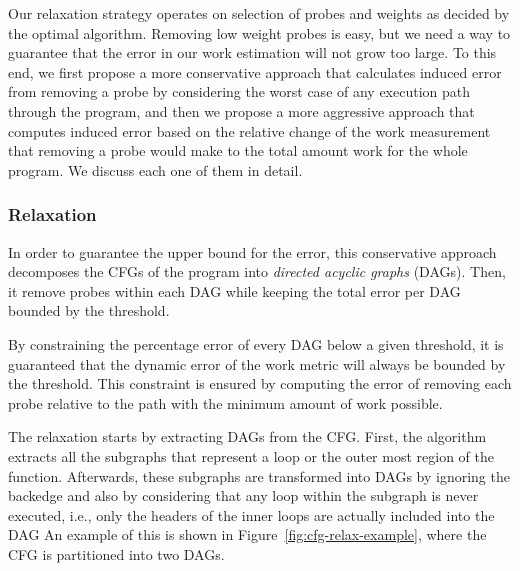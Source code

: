 Our relaxation strategy operates on selection of probes and weights as decided by the optimal algorithm. Removing low weight probes is
easy, but we need a way to guarantee that the error in our work estimation will not grow too large.
To this end, we first propose a more conservative approach that
calculates induced error from removing a probe by considering
    the worst case of any execution path through the program,
and then we propose a more aggressive approach that
    computes induced error based on the relative change of the work measurement that removing a probe would make to the total amount work for the whole program.
We discuss each one of them in detail.

\subsubsection{\WCRelaxTitle Relaxation}

In order to guarantee the upper bound for the error, this conservative approach
decomposes the CFGs of the program into \textit{directed acyclic graphs} (DAGs).
Then, it remove probes within each DAG while
keeping the total error per DAG bounded by the threshold.

By constraining the percentage error of every DAG below a given threshold,
it is guaranteed that the dynamic error of the work metric
will always be bounded by the threshold.
This constraint is ensured by computing the error of removing each probe relative
to the path with the minimum amount of work possible.

The \WCRelaxLower relaxation starts by extracting DAGs from the CFG.
First, the algorithm extracts all the subgraphs that represent a loop or the outer most region of the function.
Afterwards, these subgraphs are transformed into DAGs by ignoring the backedge and also by considering that any loop within the subgraph is never executed, i.e., only the headers of the inner loops are actually included into the DAG
An example of this is shown in Figure~\ref{fig:cfg-relax-example}, where the CFG is partitioned into two DAGs.


